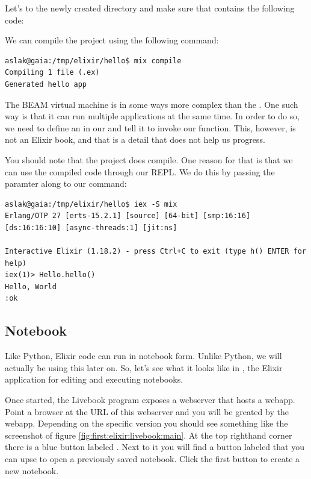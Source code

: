 Let's  to the newly created directory and make sure that  contains the following code:


We can compile the project using the following  command:

\begin{verbatim}
aslak@gaia:/tmp/elixir/hello$ mix compile
Compiling 1 file (.ex)
Generated hello app
\end{verbatim}

The BEAM virtual machine is in some ways more complex than the . One such way is that it can run multiple applications at the same time. In order to do so, we need to define an  in our  and tell it to invoke our  function. This, however, is not an Elixir book, and that is a detail that does not help us progress.

You should note that the project does compile. One reason for that is that we can use the compiled code through our REPL. We do this by passing the  paramter along to our  command:

\begin{verbatim}
aslak@gaia:/tmp/elixir/hello$ iex -S mix
Erlang/OTP 27 [erts-15.2.1] [source] [64-bit] [smp:16:16] [ds:16:16:10] [async-threads:1] [jit:ns]

Interactive Elixir (1.18.2) - press Ctrl+C to exit (type h() ENTER for help)
iex(1)> Hello.hello()
Hello, World
:ok
\end{verbatim}

\subsection{Notebook}

Like Python, Elixir code can run in notebook form. Unlike Python, we will actually be using this later on. So, let's see what it looks like in , the Elixir application for editing and executing notebooks.

Once started, the Livebook program exposes a webserver that hosts a webapp. Point a browser at the URL of this webserver and you will be greated by the webapp. Depending on the specific version you should see something like the screenshot of figure \ref{fig:first:elixir:livebook:main}. At the top righthand corner there is a blue button labeled . Next to it you will find a button labeled  that you can upse to open a previously saved notebook. Click the first button to create a new notebook.

